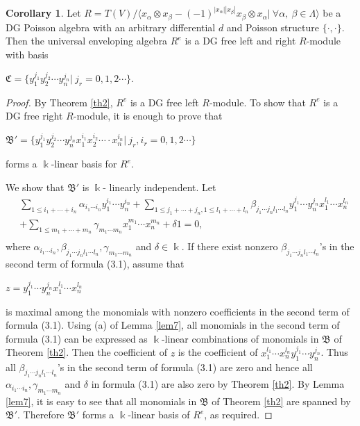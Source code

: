 \documentclass[a4paper,10pt]{amsart}
\theoremstyle{definition}
\newtheorem{corollary}[theorem]{Corollary}
\theoremstyle{remark}
\numberwithin{equation}{section}
\begin{document}
\begin{corollary}\label{cor1}
Let $R=T(V)/\langle x_{\alpha}\otimes
x_{\beta}-(-1)^{|x_{\alpha}||x_{\beta}|}x_{\beta}\otimes x_{\alpha}|
~\forall \alpha, ~\beta \in\Lambda \rangle$ be a DG Poisson algebra
with an arbitrary differential $d$ and Poisson structure $\{\cdot, \cdot\}$.
Then the universal enveloping algebra $R^{e}$ is a DG free left and
right $R$-module with basis
\begin{center}
$\mathfrak{C}=\{y_1^{j_1}y_2^{j_2}\cdots y_n^{j_n}|~j_r=0, 1, 2\cdots\}$.
 \end{center}
\end{corollary}

\begin{proof}
By Theorem \ref{th2}, $R^{e}$ is a DG free left $R$-module. To show that
$R^{e}$ is a DG free right $R$-module, it is enough to prove that
\begin{center}
$\mathfrak{B'}=\{y_1^{j_1}y_2^{j_2}\cdots y_n^{j_n}x_1^{i_1}x_2^{i_2}\cdots\cdot x_n^{i_n}|~j_r, i_r=0, 1, 2\cdots\}$
\end{center}
forms a $\Bbbk$-linear basis for $R^{e}$.

We show that $\mathfrak{B'}$ is $\Bbbk$- linearly independent. Let
\begin{equation}
\begin{split}
&\sum_{1\leq i_1+\cdots+i_n}\alpha_{i_1\cdots i_n}y_1^{i_1}\cdots y_n^{i_n}+\sum_{1\leq
j_1+\cdots+j_n, 1\leq
l_1+\cdots+l_n}\beta_{j_1\cdots j_nl_1\cdots l_n}y_1^{j_1}\cdots y_n^{j_n}x_1^{l_1}\cdots x_n^{l_n}\\
&+\sum_{1\leq m_1+\cdots+m_n}\gamma_{m_1\cdots m_n}x_1^{m_1}\cdots x_n^{m_n}+\delta1=0,\\
\end{split}
\end{equation}
where $\alpha_{i_1\cdots i_n}, \beta_{j_1\cdots j_nl_1\cdots l_n}, \gamma_{m_1\cdots m_n}$ and $\delta\in \Bbbk$. If there exist nonzero $\beta_{j_1\cdots j_nl_1\cdots l_n}$'s in the second term of formula (3.1),
assume that
\begin{center}
$z=y_1^{j_1}\cdots y_n^{j_n}x_1^{l_1}\cdots x_n^{l_n}$
 \end{center}
 is maximal among the monomials with nonzero coefficients in the
 second term of formula (3.1). Using (a) of Lemma \ref{lem7}, all monomials in the second term of formula (3.1) can be
expressed as $\Bbbk$-linear combinations of monomials in
$\mathfrak{B}$ of Theorem \ref{th2}. Then the coefficient of $z$ is the
coefficient of $x_1^{l_1}\cdots x_n^{l_n}y_1^{j_1}\cdots y_n^{j_n}$. Thus all
$\beta_{j_1\cdots j_nl_1\cdots l_n}$'s in the
second term of formula (3.1) are zero and hence all
$\alpha_{i_1\cdots i_n}, \gamma_{m_1\cdots m_n}$
and $\delta$ in formula (3.1) are also zero by Theorem \ref{th2}. By
Lemma \ref{lem7}, it is easy to see that all monomials in $\mathfrak{B}$
of Theorem \ref{th2} are spanned by $\mathfrak{B'}$. Therefore
$\mathfrak{B'}$ forms a $\Bbbk$-linear basis of $R^{e}$, as
required.
\end{proof}
\end{document}
